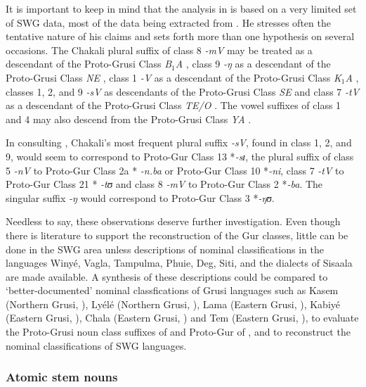 \begin{exe}
\begin{exe}
\begin{exe}
{\begin{exe}
\begin{exe}
\begin{exe}
\begin{exe}
It is important to keep in mind that the analysis in \citet{Mane69a, Mane69b} is
based on a very
limited set of SWG data,  most of the data being extracted from
\citet{Bend65}. He
stresses often the tentative nature of his claims and  sets forth more than one
 hypothesis on several occasions. The Chakali plural suffix of class 8 {\it -mV}
may be treated as a descendant of the Proto-Grusi Class {\it *B$_{1}$A}
\citep[32]{Mane69b}, class 9 {\it -ŋ} as a descendant of the Proto-Grusi Class
{\it *NE}   \citep[37, 41]{Mane69b}, class 1 {\it -V} as a descendant of the
Proto-Grusi
Class {\it *K$_{1}$A}  \citep[39]{Mane69b}, classes 1, 2, and 9 {\it -sV} as 
descendants
of the Proto-Grusi Class  {\it *SE}  \citep[39]{Mane69b} and class 7 {\it -tV} 
as
a descendant of the Proto-Grusi Class {\it *TE/O}  \citep[43]{Mane69b}. The 
vowel
suffixes of class 1 and 4 may also descend from the Proto-Grusi Class {\it *YA}
\citep[34]{Mane69b}. 

In consulting \citet[7--22]{Mieh07}, Chakali's  most frequent plural suffix  
{\it -sV}, found in class 1, 2, and 9, would seem to correspond to Proto-Gur 
Class 13
*{\it -sɪ}, the plural suffix of class 5 {\it -nV} to  Proto-Gur Class 2a *{\it 
-n.ba}
or Proto-Gur Class 10 *{\it -ni}, class 7 {\it -tV} to Proto-Gur Class 21 *{\it 
-tʊ} and class 8  {\it -mV}  to Proto-Gur Class 2 *{\it -ba}. The singular 
suffix
{\it -ŋ} would correspond to Proto-Gur Class 3 *{\it -ŋʊ}.


Needless to say, these observations  deserve further investigation. Even though
there is  literature to support the reconstruction of the Gur classes, little
can be done in the SWG
area unless descriptions of  nominal classifications in the languages  Winyé,
Vagla, Tampulma, Phuie,  Deg, Siti,  and the dialects of Sisaala  are made 
available. A synthesis of these
descriptions could be
compared to  `better-documented' nominal classfications of Grusi languages 
such as Kasem (Northern Grusi, \citet{Awed79, Bonv88, Awed03}),  Lyélé (Northern
Grusi, \citet{Delp79}),  Lama  (Eastern Grusi, \citet{Arit87, Ours89}), Kabiyé
(Eastern Grusi, \citet{Tcha07}),  Chala   (Eastern Grusi, \citet{Klei00}) and 
Tem
(Eastern Grusi, \citet{Tcha72, Tcha07}), to evaluate the Proto-Grusi noun class
suffixes of \citet{Mane69b} and Proto-Gur of \citet{Mieh07}, and to reconstruct
the nominal classifications of SWG  languages.


\subsubsection{Atomic stem nouns}
\label{sec:GRM-sim-bas-noun}


\end{exe}
\end{exe}
\end{exe}
\end{exe}}
\end{exe}
\end{exe}
\end{exe}
